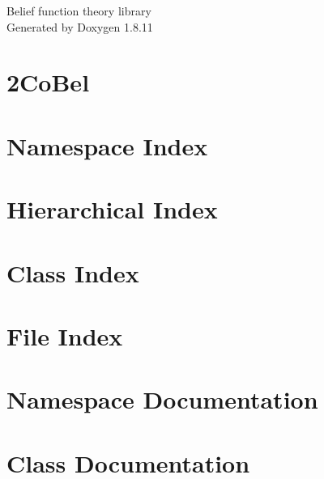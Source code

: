 \documentclass[twoside]{book}
\newcommand{\+}{\discretionary{\mbox{\scriptsize$\hookleftarrow$}}{}{}}
\newcommand{\clearemptydoublepage}{%
  \newpage{\pagestyle{empty}\cleardoublepage}%
}
\begin{document}
\hypersetup{pageanchor=false,
             bookmarksnumbered=true,
             pdfencoding=unicode
            }
\begin{titlepage}
\vspace*{7cm}
\begin{center}%
{\Large Belief function theory library }\\
\vspace*{1cm}
{\large Generated by Doxygen 1.8.11}\\
\end{center}
\end{titlepage}
\clearemptydoublepage
\tableofcontents
\clearemptydoublepage
{}
\hypersetup{pageanchor=true}

\chapter{2\+Co\+Bel}
\label{md_README}
\hypertarget{md_README}{}

\chapter{Namespace Index}

\chapter{Hierarchical Index}

\chapter{Class Index}

\chapter{File Index}

\chapter{Namespace Documentation}



\chapter{Class Documentation}
























\end{document}
